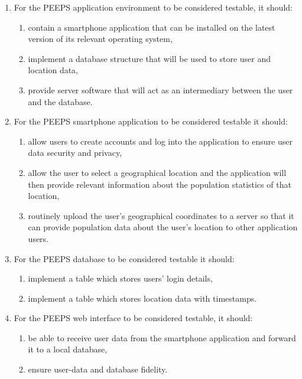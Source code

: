 \begin{enumerate}
    \item For the PEEPS application environment to be considered testable, it should:
    \begin{enumerate}
        \item contain a smartphone application that can be installed on the latest version of its relevant operating system,
        \item implement a database structure that will be used to store user and location data,
        \item provide server software that will act as an intermediary between the user and the database.
    \end{enumerate}
    \item For the PEEPS smartphone application to be considered testable it should:
    \begin{enumerate}
        \item allow users to create accounts and log into the application to ensure user data security and privacy,
        \item allow the user to select a geographical location and the application will then provide relevant information about the population statistics of that location,
        \item routinely upload the user's geographical coordinates to a server so that it can provide population data about the user's location to other application users.
    \end{enumerate}
    \item For the PEEPS database to be considered testable it should:
    \begin{enumerate}
        \item implement a table which stores users' login details,
        \item implement a table which stores location data with timestamps.
    \end{enumerate}
    \item For the PEEPS web interface to be considered testable, it should:
    \begin{enumerate}
        \item be able to receive user data from the smartphone application and forward it to a local database,
        \item ensure user-data and database fidelity.
    \end{enumerate}
\end{enumerate}

